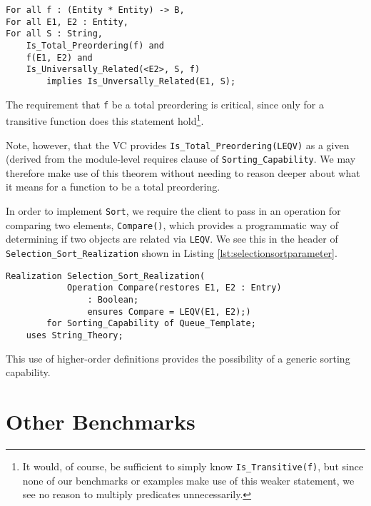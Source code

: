 \begin{lstlisting}[float=h,language=resolve,caption={A Useful \texttt{Is\_Universally\_Related} theorem\label{lst:universallyrelatedtheorem}}]
For all f : (Entity * Entity) -> B,
For all E1, E2 : Entity,
For all S : String,
	Is_Total_Preordering(f) and
	f(E1, E2) and
	Is_Universally_Related(<E2>, S, f)
		implies Is_Unversally_Related(E1, S);
\end{lstlisting}

The requirement that \texttt{f} be a total preordering is critical, since only for a transitive function does this statement hold\footnote{It would, of course, be sufficient to simply know \texttt{Is\_Transitive(f)}, but since none of our benchmarks or examples make use of this weaker statement, we see no reason to multiply predicates unnecessarily.}.

Note, however, that the VC provides \texttt{Is\_Total\_Preordering(LEQV)} as a given (derived from the module-level requires clause of \texttt{Sorting\_Capability}.  We may therefore make use of this theorem without needing to reason deeper about what it means for a function to be a total preordering.

In order to implement \texttt{Sort}, we require the client to pass in an operation for comparing two elements, \texttt{Compare()}, which provides a programmatic way of determining if two objects are related via \texttt{LEQV}.  We see this in the header of \texttt{Selection\_Sort\_Realization} shown in Listing \ref{lst:selectionsortparameter}.

\begin{lstlisting}[float=h,language=resolve,caption={\texttt{Selection\_Sort\_Realization} taking an operation that implements \texttt{LEQV}\label{lst:selectionsortparameter}}]
Realization Selection_Sort_Realization(
			Operation Compare(restores E1, E2 : Entry) 
				: Boolean;
				ensures Compare = LEQV(E1, E2);)
		for Sorting_Capability of Queue_Template;
	uses String_Theory;
\end{lstlisting}

This use of higher-order definitions provides the possibility of a generic sorting capability.


\section{Other Benchmarks}

